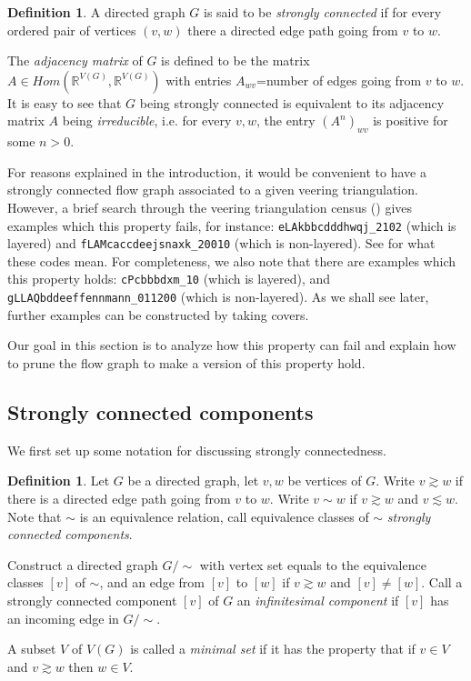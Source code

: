 \documentclass[12pt]{amsart}
\theoremstyle{definition}
\newtheorem{defn}[thm]{Definition}
\numberwithin{equation}{section}
\begin{document}
\begin{defn} \label{defn:PF}
A directed graph $G$ is said to be \textit{strongly connected} if for every ordered pair of vertices $(v,w)$ there a directed edge path going from $v$ to $w$.

The \textit{adjacency matrix} of $G$ is defined to be the matrix $A \in Hom(\mathbb{R}^{V(G)}, \mathbb{R}^{V(G)})$ with entries $A_{wv}$=number of edges going from $v$ to $w$. It is easy to see that $G$ being strongly connected is equivalent to its adjacency matrix $A$ being \textit{irreducible}, i.e. for every $v,w$, the entry $(A^n)_{wv}$ is positive for some $n>0$.
\end{defn}

For reasons explained in the introduction, it would be convenient to have a strongly connected flow graph associated to a given veering triangulation. However, a brief search through the veering triangulation census (\cite{GSS}) gives examples which this property fails, for instance: \texttt{eLAkbbcdddhwqj\_2102} (which is layered) and \texttt{fLAMcaccdeejsnaxk\_20010} (which is non-layered). See \cite{GSS} for what these codes mean. For completeness, we also note that there are examples which this property holds: \texttt{cPcbbbdxm\_10} (which is layered), and \texttt{gLLAQbddeeffennmann\_011200} (which is non-layered). As we shall see later, further examples can be constructed by taking covers.

Our goal in this section is to analyze how this property can fail and explain how to prune the flow graph to make a version of this property hold.

\subsection{Strongly connected components} \label{subsec:PFcomp}

We first set up some notation for discussing strongly connectedness.

\begin{defn} \label{defn:PFcomp}
Let $G$ be a directed graph, let $v,w$ be vertices of $G$. Write $v \gtrsim w$ if there is a directed edge path going from $v$ to $w$. Write $v \sim w$ if $v \gtrsim w$ and $v \lesssim w$. Note that $\sim$ is an equivalence relation, call equivalence classes of $\sim$ \textit{strongly connected components}.

Construct a directed graph $G/{\sim}$ with vertex set equals to the equivalence classes $[v]$ of $\sim$, and an edge from $[v]$ to $[w]$ if $v \gtrsim w$ and $[v] \neq [w]$. Call a strongly connected component $[v]$ of $G$ an \textit{infinitesimal component} if $[v]$ has an incoming edge in $G/{\sim}$.

A subset $V$ of $V(G)$ is called a \textit{minimal set} if it has the property that if $v \in V$ and $v \gtrsim w$ then $w \in V$.
\end{defn}
\end{document}
